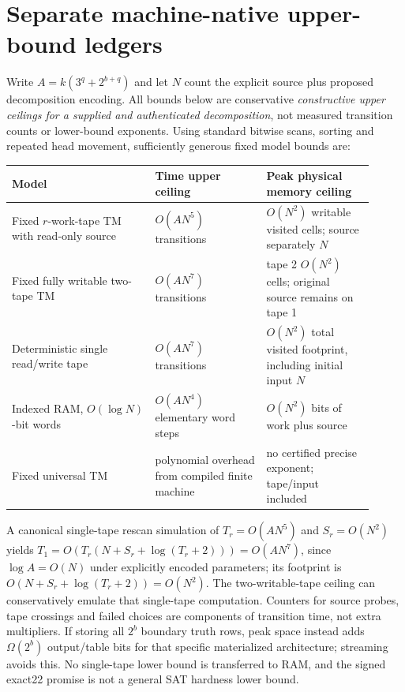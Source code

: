 \documentclass[11pt]{article}
\begin{document}
\section{Separate machine-native upper-bound ledgers}
Write $A=k(3^q+2^{b+q})$ and let $N$ count the explicit source plus proposed decomposition encoding. All bounds below are conservative \emph{constructive upper ceilings for a supplied and authenticated decomposition}, not measured transition counts or lower-bound exponents. Using standard bitwise scans, sorting and repeated head movement, sufficiently generous fixed model bounds are:
\begin{center}\small
\begin{tabular}{p{0.36\linewidth}p{0.28\linewidth}p{0.27\linewidth}}\toprule
Model & Time upper ceiling & Peak physical memory ceiling\\\midrule
Fixed $r$-work-tape TM with read-only source & $O(AN^5)$ transitions & $O(N^2)$ writable visited cells; source separately $N$\\
Fixed fully writable two-tape TM & $O(AN^7)$ transitions & tape 2 $O(N^2)$ cells; original source remains on tape 1\\
Deterministic single read/write tape & $O(AN^7)$ transitions & $O(N^2)$ total visited footprint, including initial input $N$\\
Indexed RAM, $O(\log N)$-bit words & $O(AN^4)$ elementary word steps & $O(N^2)$ bits of work plus source\\
Fixed universal TM & polynomial overhead from compiled finite machine & no certified precise exponent; tape/input included\\\bottomrule
\end{tabular}\end{center}
A canonical single-tape rescan simulation of $T_r=O(AN^5)$ and $S_r=O(N^2)$ yields $T_1=O(T_r(N+S_r+\log(T_r+2)))=O(AN^7)$, since $\log A=O(N)$ under explicitly encoded parameters; its footprint is $O(N+S_r+\log(T_r+2))=O(N^2)$. The two-writable-tape ceiling can conservatively emulate that single-tape computation. Counters for source probes, tape crossings and failed choices are components of transition time, not extra multipliers. If storing all $2^b$ boundary truth rows, peak space instead adds $\Omega(2^b)$ output/table bits for that specific materialized architecture; streaming avoids this. No single-tape lower bound is transferred to RAM, and the signed exact22 promise is not a general SAT hardness lower bound.
\end{document}
